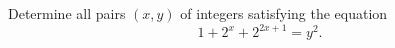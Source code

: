 Determine all pairs $(x, y)$ of integers satisfying the equation
\[
1 + 2^{x} + 2^{2x+1} = y^{2}.
\]

